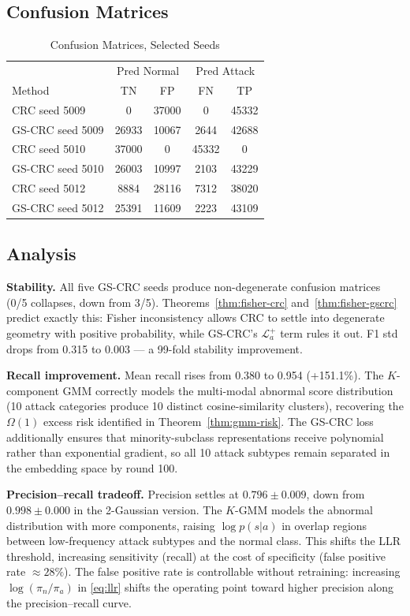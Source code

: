 \documentclass[conference]{IEEEtran}
\begin{document}
\subsection{Confusion Matrices}

\begin{table}[t]
\caption{Confusion Matrices, Selected Seeds}
\label{tab:cm}
\centering
\begin{tabular}{lcccc}
\toprule
& \multicolumn{2}{c}{Pred Normal} & \multicolumn{2}{c}{Pred Attack}\\
Method & TN & FP & FN & TP\\
\midrule
CRC seed 5009 & 0 & 37000 & 0 & 45332\\
GS-CRC seed 5009 & 26933 & 10067 & 2644 & 42688\\
\midrule
CRC seed 5010 & 37000 & 0 & 45332 & 0\\
GS-CRC seed 5010 & 26003 & 10997 & 2103 & 43229\\
\midrule
CRC seed 5012 & 8884 & 28116 & 7312 & 38020\\
GS-CRC seed 5012 & 25391 & 11609 & 2223 & 43109\\
\bottomrule
\end{tabular}
\end{table}

\subsection{Analysis}

\noindent\textbf{Stability.}
All five GS-CRC seeds produce non-degenerate confusion matrices
(0/5 collapses, down from 3/5). Theorems~\ref{thm:fisher-crc}
and~\ref{thm:fisher-gscrc} predict exactly this: Fisher inconsistency
allows CRC to settle into degenerate geometry with positive probability,
while GS-CRC's $\mathcal{L}_a^+$ term rules it out.
F1 std drops from 0.315 to 0.003 --- a 99-fold stability improvement.

\noindent\textbf{Recall improvement.}
Mean recall rises from 0.380 to 0.954 (+151.1\%). The $K$-component GMM
correctly models the multi-modal abnormal score distribution (10 attack
categories produce 10 distinct cosine-similarity clusters), recovering the
$\Omega(1)$ excess risk identified in Theorem~\ref{thm:gmm-risk}. The
GS-CRC loss additionally ensures that minority-subclass representations
receive polynomial rather than exponential gradient, so all 10 attack
subtypes remain separated in the embedding space by round 100.

\noindent\textbf{Precision--recall tradeoff.}
Precision settles at $0.796 \pm 0.009$, down from $0.998 \pm 0.000$ in the
2-Gaussian version. The $K$-GMM models the abnormal distribution with more
components, raising $\log p(s|a)$ in overlap regions between low-frequency
attack subtypes and the normal class.
This shifts the LLR threshold, increasing sensitivity (recall) at the cost
of specificity (false positive rate $\approx 28\%$).
The false positive rate is controllable without retraining: increasing
$\log(\pi_n/\pi_a)$ in \eqref{eq:llr} shifts the operating point toward
higher precision along the precision--recall curve.
\end{document}

